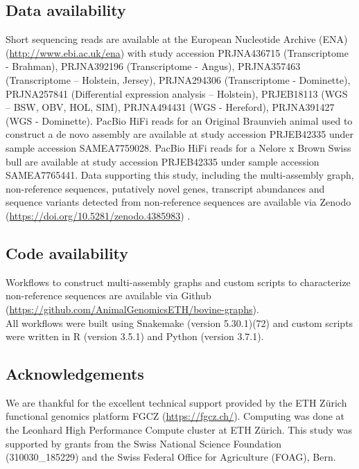 \documentclass[../main.tex]{subfiles}
\begin{document}
\subsection*{Data availability}

Short sequencing reads are available at the European Nucleotide Archive (ENA) (\url{http://www.ebi.ac.uk/ena}) with study accession PRJNA436715 (Transcriptome - Brahman), PRJNA392196 (Transcriptome - Angus), PRJNA357463 (Transcriptome – Holstein, Jersey), PRJNA294306 (Transcriptome - Dominette), PRJNA257841 (Differential expression analysis – Holstein), PRJEB18113 (WGS – BSW, OBV, HOL, SIM), PRJNA494431 (WGS - Hereford), PRJNA391427 (WGS - Dominette). PacBio HiFi reads for an Original Braunvieh animal used to construct a de novo assembly are available at study accession PRJEB42335 under sample accession SAMEA7759028. PacBio HiFi reads for a Nelore x Brown Swiss bull are available at study accession PRJEB42335 under sample accession SAMEA7765441. Data supporting this study, including the multi-assembly graph, non-reference sequences, putatively novel genes, transcript abundances and sequence variants detected from non-reference sequences are available via Zenodo (\url{https://doi.org/10.5281/zenodo.4385983}) \citep{Crysnanto2021}. 

\subsection*{Code availability}

Workflows to construct multi-assembly graphs and custom scripts to characterize non-reference sequences are available via Github \\
(\url{https://github.com/AnimalGenomicsETH/bovine-graphs}). \\
All workflows were built using Snakemake (version 5.30.1)(72) and custom scripts were written in R (version 3.5.1) \citep{RCoreTeam2017} and Python (version 3.7.1). 

\subsection*{Acknowledgements}

We are thankful for the excellent technical support provided by the ETH Zürich functional genomics platform FGCZ (\url{https://fgcz.ch/}). Computing was done at the Leonhard High Performance Compute cluster at ETH Zürich. This study was supported by grants from the Swiss National Science Foundation (310030\_185229) and the Swiss Federal Office for Agriculture (FOAG), Bern.



\singlespacing
\footnotesize







\ifdefined\BuildingFromMainFile
\else
   
\end{document}
